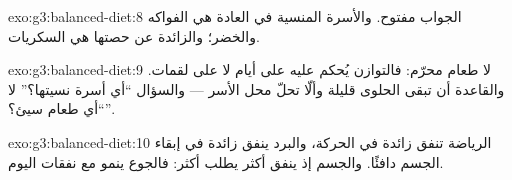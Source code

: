 \begin{solution}{exo:g3:balanced-diet:8}
الجواب مفتوح. والأسرة المنسية في العادة هي الفواكه والخضر؛
والزائدة عن حصتها هي السكريات.
\end{solution}

\begin{solution}{exo:g3:balanced-diet:9}
لا طعام محرّم: فالتوازن يُحكم عليه على أيام لا على لقمات. والقاعدة
أن تبقى الحلوى قليلة وألّا تحلّ محل الأسر --- والسؤال ``أي أسرة
نسيتها؟'' لا ``أي طعام سيئ؟''.
\end{solution}

\begin{solution}{exo:g3:balanced-diet:10}
الرياضة تنفق  زائدة في الحركة، والبرد ينفق  زائدة في
إبقاء الجسم دافئًا. والجسم إذ ينفق أكثر يطلب أكثر: فالجوع ينمو مع
نفقات اليوم.
\end{solution}
